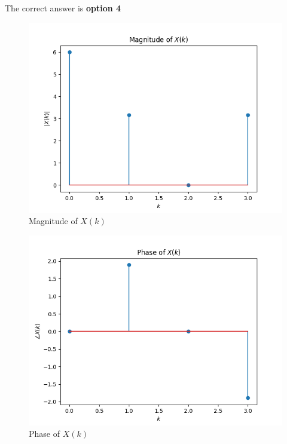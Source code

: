 \documentclass[journal,12pt,twocolumn]{IEEEtran}
\begin{document}
The correct answer is \textbf{option 4}
\begin{figure}[!ht]
    \centering
    \includegraphics[width=\columnwidth]{plot/magnitude}
    \caption{Magnitude of $X(k)$}
    \label{magnitude}
\end{figure}
\begin{figure}[!ht]
    \centering
    \includegraphics[width=\columnwidth]{plot/phase}
    \caption{Phase of $X(k)$}
    \label{magnitude}
\end{figure}
\end{document}
